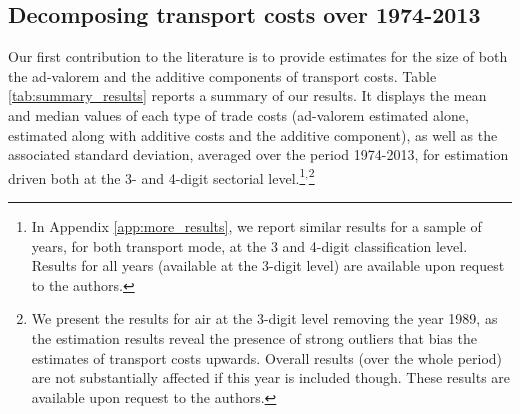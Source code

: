 \documentclass[a4paper,11pt]{article}
\begin{document}
\subsection{Decomposing transport costs over 1974-2013}

Our first contribution to the literature is to provide estimates for the size of both the ad-valorem and the additive components of transport costs. Table \ref{tab:summary_results} reports a summary of our results. It displays the mean and median values of each type of trade costs (ad-valorem estimated alone, estimated along with additive costs and the additive component), as well as the associated standard deviation, averaged over the period 1974-2013, for estimation driven both at the 3- and 4-digit sectorial level.\footnote{In Appendix \ref{app:more_results}, we report similar results for a sample of years, for both transport mode, at the 3 and 4-digit classification level. Results for all years (available at the 3-digit level) are available upon request to the authors.}$^{,}$\footnote{We present the results for air at the 3-digit level removing the year 1989, as the estimation results reveal the presence of strong outliers that bias the estimates of transport costs upwards. Overall results (over the whole period) are not substantially affected if this year is included though. These results are available upon request to the authors.}
\end{document}
